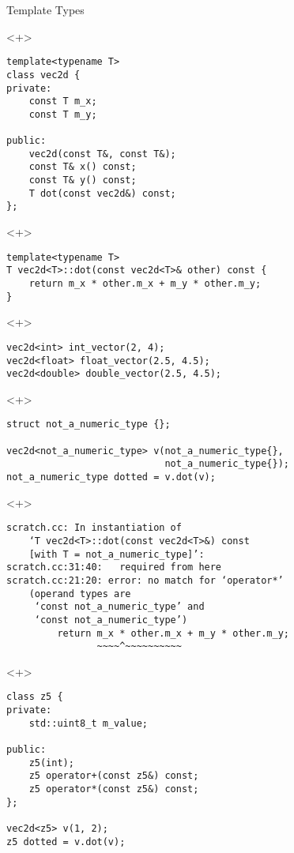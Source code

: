 \documentclass[table]{beamer}
\begin{document}
\begin{frame}[fragile]{Template Types}
  \begin{onlyenv}<+>
    \begin{verbatim}
template<typename T>
class vec2d {
private:
    const T m_x;
    const T m_y;

public:
    vec2d(const T&, const T&);
    const T& x() const;
    const T& y() const;
    T dot(const vec2d&) const;
};
    \end{verbatim}
  \end{onlyenv}

  \begin{onlyenv}<+>
    \begin{verbatim}
template<typename T>
T vec2d<T>::dot(const vec2d<T>& other) const {
    return m_x * other.m_x + m_y * other.m_y;
}
    \end{verbatim}
  \end{onlyenv}

  \begin{onlyenv}<+>
    \begin{verbatim}
vec2d<int> int_vector(2, 4);
vec2d<float> float_vector(2.5, 4.5);
vec2d<double> double_vector(2.5, 4.5);
    \end{verbatim}
  \end{onlyenv}

  \begin{onlyenv}<+>
    \begin{verbatim}
struct not_a_numeric_type {};

vec2d<not_a_numeric_type> v(not_a_numeric_type{},
                            not_a_numeric_type{});
not_a_numeric_type dotted = v.dot(v);
    \end{verbatim}
  \end{onlyenv}

  \begin{onlyenv}<+>
    \begin{verbatim}
scratch.cc: In instantiation of
    ‘T vec2d<T>::dot(const vec2d<T>&) const
    [with T = not_a_numeric_type]’:
scratch.cc:31:40:   required from here
scratch.cc:21:20: error: no match for ‘operator*’
    (operand types are
     ‘const not_a_numeric_type’ and
     ‘const not_a_numeric_type’)
         return m_x * other.m_x + m_y * other.m_y;
                ~~~~^~~~~~~~~~~
    \end{verbatim}
  \end{onlyenv}

  \begin{onlyenv}<+>
    \begin{verbatim}
class z5 {
private:
    std::uint8_t m_value;

public:
    z5(int);
    z5 operator+(const z5&) const;
    z5 operator*(const z5&) const;
};

vec2d<z5> v(1, 2);
z5 dotted = v.dot(v);
    \end{verbatim}
  \end{onlyenv}
\end{frame}
\end{document}
